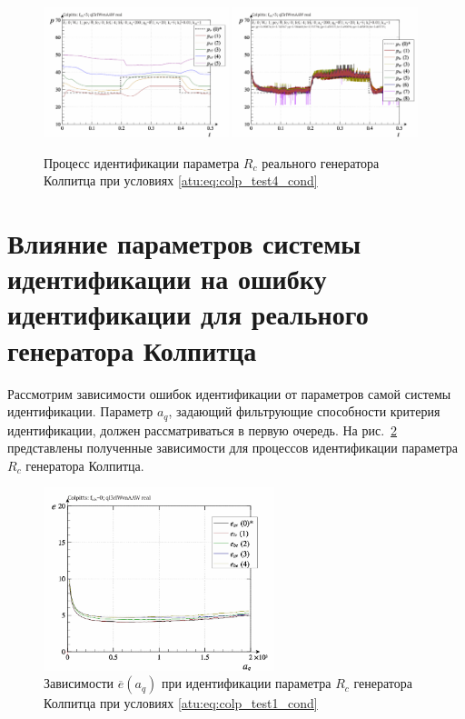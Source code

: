 \begin{figure}[htb!]
  \centerline{
    \includegraphics[width=0.48\textwidth]{p/r/colp_real_id-p_t_pi_ql3rlWvnAAW_real_d_3.png}
    \hfill
    \includegraphics[width=0.48\textwidth]{p/r/colp_real_id-p_t_p_ql3rlWvnAAW_real_d_3.png}
  }
  \caption{Процесс идентификации параметра $R_c$ реального генератора Колпитца при условиях \ref{atu:eq:colp_test4_cond} }
  \label{atu:f:colp_r_id_4}
\end{figure}


\section{Влияние параметров системы идентификации на ошибку идентификации для реального генератора Колпитца}  %


Рассмотрим зависимости ошибок идентификации от параметров самой системы идентификации.
Параметр $a_q$, задающий
фильтрующие способности критерия идентификации, должен рассматриваться в первую очередь.
На рис.~\ref{atu:f:colp_real_id_p_a_q_d_0} представлены полученные зависимости
для процессов идентификации параметра $R_c$ генератора Колпитца.

\begin{figure}[htb!]
  \centerline{\includegraphics[width=0.6\textwidth]{p/r/colp_real_id-p_a_q_d_0.png} }
  \caption{Зависимости $\overline{e}(a_q)$ при идентификации параметра $R_c$ генератора Колпитца при условиях \ref{atu:eq:colp_test1_cond} }
  \label{atu:f:colp_real_id_p_a_q_d_0}
\end{figure}


